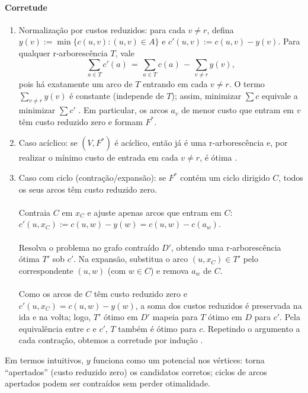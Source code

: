\documentclass[12pt,a4paper]{article}
\def\emph#1{#1}%
\begin{document}
\paragraph{Corretude}
\begin{enumerate}\setlength{\itemsep}{2pt}
    \item \emph{Normalização por custos reduzidos:} para cada \(v\neq r\), defina \(y(v):=\min\{c(u,v):(u,v)\in A\}\) e \(c'(u,v):=c(u,v)-y(v)\). Para qualquer r‑arborescência \(T\), vale
    \[
        \sum_{a\in T} c'(a) \,=\, \sum_{a\in T} c(a) \, - \, \sum_{v\neq r} y(v),
    \]
    pois há exatamente um arco de \(T\) entrando em cada \(v\neq r\). O termo \(\sum_{v\neq r} y(v)\) é constante (independe de \(T\)); assim, minimizar \(\sum c\) equivale a minimizar \(\sum c'\) \cite[Obs.~4.37]{kleinberg2006}. Em particular, os arcos \(a_v\) de menor custo que entram em \(v\) têm custo reduzido zero e formam \(F^*\).
    \item \emph{Caso acíclico:} se \((V,F^*)\) é acíclico, então já é uma r‑arborescência e, por realizar o mínimo custo de entrada em cada \(v\neq r\), é ótima \cite[Obs.~4.36]{kleinberg2006}.
    \item \emph{Caso com ciclo (contração/expansão):} se \(F^*\) contém um ciclo dirigido \(C\), todos os seus arcos têm custo reduzido zero. 
    \paragraph{}
    Contraia \(C\) em \(x_C\) e ajuste apenas arcos que \emph{entram} em \(C\): \(c'(u,x_C):=c(u,w)-y(w)=c(u,w)-c(a_w)\). 
    \paragraph{}
    Resolva o problema no grafo contraído \(D'\), obtendo uma r‑arborescência ótima \(T'\) sob \(c'\). Na expansão, substitua o arco \((u,x_C)\in T'\) pelo correspondente \((u,w)\) (com \(w\in C\)) e remova \(a_w\) de \(C\). 
    \paragraph{}
    Como os arcos de \(C\) têm custo reduzido zero e \(c'(u,x_C)=c(u,w)-y(w)\), a soma dos custos reduzidos é preservada na ida e na volta; logo, \(T'\) ótimo em \(D'\) mapeia para \(T\) ótimo em \(D\) para \(c'\). Pela equivalência entre \(c\) e \(c'\), \(T\) também é ótimo para \(c\). Repetindo o argumento a cada contração, obtemos a corretude por indução \cite[Sec.~4.9]{kleinberg2006,schrijver2003comb}.
\end{enumerate}
Em termos intuitivos, \(y\) funciona como um potencial nos vértices: torna “apertados” (custo reduzido zero) os candidatos corretos; ciclos de arcos apertados podem ser contraídos sem perder otimalidade.
\end{document}

